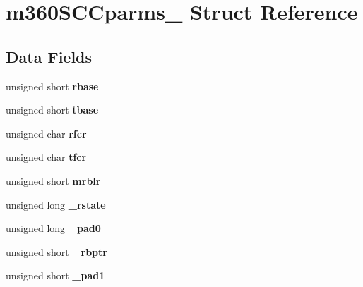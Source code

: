 \hypertarget{structm360SCCparms__}{}\section{m360\+S\+C\+Cparms\+\_\+ Struct Reference}
\label{structm360SCCparms__}
\subsection*{Data Fields}
\begin{DoxyCompactItemize}
\item 
\mbox{\label{structm360SCCparms___accf04fadfc5de97d5a54053466c09c68}} 
unsigned short {\bfseries rbase}
\item 
\mbox{\label{structm360SCCparms___a0ae2ce16061b01a73b12cc627cb2ea88}} 
unsigned short {\bfseries tbase}
\item 
\mbox{\label{structm360SCCparms___a923644b19b9642ddbf26f4e5e891d1b4}} 
unsigned char {\bfseries rfcr}
\item 
\mbox{\label{structm360SCCparms___ae3188c80d05fb544585862f35deb6804}} 
unsigned char {\bfseries tfcr}
\item 
\mbox{\label{structm360SCCparms___ad143811a9e9a9d6765af49af1e327f18}} 
unsigned short {\bfseries mrblr}
\item 
\mbox{\label{structm360SCCparms___a954b738a6ff245aac0d8475d8be47f96}} 
unsigned long {\bfseries \+\_\+rstate}
\item 
\mbox{\label{structm360SCCparms___a3641ade20f27f8ac9318578241a85c12}} 
unsigned long {\bfseries \+\_\+pad0}
\item 
\mbox{\label{structm360SCCparms___aef04440c5d454dd6f03c657d6cdad46e}} 
unsigned short {\bfseries \+\_\+rbptr}
\item 
\mbox{\label{structm360SCCparms___aac686b1dafbc979737f9bc25f8e1f8f6}} 
unsigned short {\bfseries \+\_\+pad1}
\item 

\end{DoxyCompactItemize}
